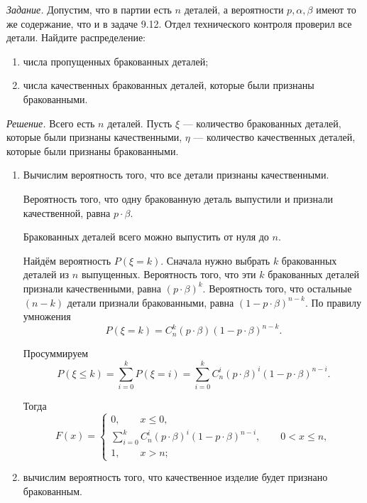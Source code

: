 \textit{Задание.} Допустим, что в партии есть $n$ деталей, а вероятности $p, \alpha, \beta $ имеют то же содержание, что и в задаче 9.12.
Отдел технического контроля проверил все детали.
Найдите распределение:
\begin{enumerate}[label=\alph*)]
\item числа пропущенных бракованных деталей;
\item числа качественных бракованных деталей, которые были признаны бракованными. 
\end{enumerate}

\textit{Решение.} Всего есть $n$ деталей.
Пусть $ \xi $ --- количество бракованных деталей,
которые были признаны качественными, $ \eta $ --- количество качественных деталей, которые были признаны бракованными.

\begin{enumerate}[label=\alph*)]
\item Вычислим вероятность того, что все детали признаны качественными.

Вероятность того, что одну бракованную деталь выпустили и признали качественной, равна $p \cdot \beta $.

Бракованных деталей всего можно выпустить от нуля до $n$.

Найдём вероятность $P \left( \xi = k \right) $.
Сначала нужно выбрать $k$ бракованных деталей из $n$ выпущенных.
Вероятность того, что эти $k$ бракованных деталей признали качественными, равна $ \left( p \cdot \beta \right)^k$.
Вероятность того, что остальные $ \left( n - k \right) $ детали признали бракованными, равна $ \left( 1 - p \cdot \beta \right)^{n-k}$.
По правилу умножения
$$P \left( \xi = k \right) =
C_n^k \left( p \cdot \beta \right) \left( 1 - p \cdot \beta \right)^{n-k}.$$

Просуммируем
$$P \left( \xi \leq k \right) =
\sum \limits_{i=0}^k P \left( \xi = i \right) =
\sum \limits_{i=0}^k C_n^i \left( p \cdot \beta \right)^i \left( 1 - p \cdot \beta \right)^{n-i}.$$

Тогда
$$F \left( x \right) =
\begin{cases}
0, \qquad x \leq 0, \\
\sum \limits_{i=0}^k C_n^i \left( p \cdot \beta \right)^i \left( 1 - p \cdot \beta \right)^{n-i}, \qquad 0 < x \leq n, \\
1, \qquad x > n;
\end{cases}$$
\item вычислим вероятность того, что качественное изделие будет признано бракованным.


\end{enumerate}
